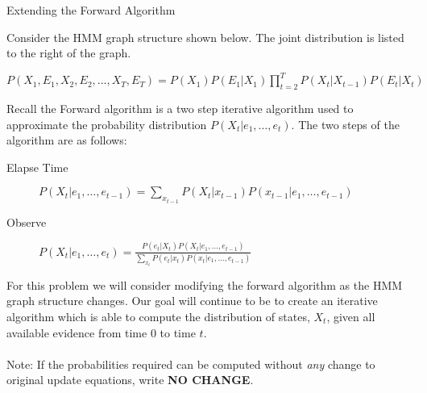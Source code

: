 \begin{problem}{Extending the Forward Algorithm}


Consider the HMM graph structure shown below. The joint distribution is listed to the right of the graph. \\
\begin{minipage}{5cm} {
}
\end{minipage}
\begin{minipage}{15cm} {
$P(X_1, E_1, X_2, E_2, ..., X_T, E_T) = P(X_1) P(E_1 | X_1)
\prod_{t=2}^T P(X_t | X_{t-1}) P(E_t | X_t)$
}
\end{minipage}
\vspace{0.1in}

Recall the Forward algorithm is a two step iterative algorithm used to approximate the probability distribution $P(X_t | e_1, \dots, e_t)$. The two steps of the algorithm are as follows:
\begin{description}
\item[Elapse Time]
  $P(X_t | e_1, \dots, e_{t-1}) = \sum_{x_{t-1}} P(X_t | x_{t-1}) P(x_{t-1} | e_1, \dots, e_{t-1})$
\item[Observe]
  $P(X_t | e_1,\dots, e_t) = \frac{P(e_t | X_t) P(X_t | e_1, \dots, e_{t-1})}{\sum_{x_t} P(e_t | x_t) P(x_t | e_1, \dots, e_{t-1})}$
\end{description}

For this problem we will consider modifying the forward algorithm as the HMM graph structure changes. Our goal will continue to be to create an iterative algorithm which is able to compute the distribution of states, $X_t$, given all available evidence from time 0 to time $t$.
\\\\
Note: If the probabilities required can be computed without \textit{any} change to original update equations, write {\bf NO CHANGE}.\\



\end{problem}
